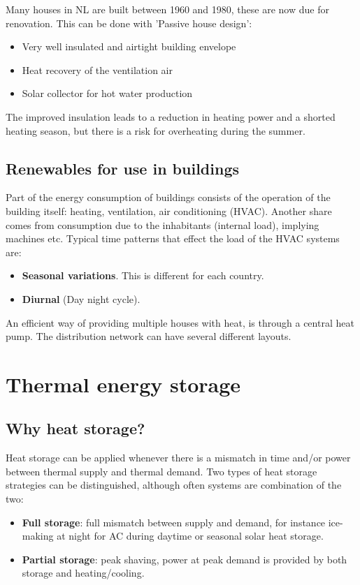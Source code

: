\documentclass[a4paper,10pt]{article}
\begin{document}
Many houses in NL are built between 1960 and 1980, these are now due for renovation. This can be done with 'Passive house design':
\begin{itemize}
 \item Very well insulated and airtight building envelope
 \item Heat recovery of the ventilation air
 \item Solar collector for hot water production
\end{itemize}
The improved insulation leads to a reduction in heating power and a shorted heating season, but there is a risk for overheating during the summer.

\subsection{Renewables for use in buildings}
Part of the energy consumption of buildings consists of the operation of the building itself: heating, ventilation, air conditioning (HVAC). Another share comes from consumption due to the inhabitants (internal load), implying machines etc. Typical time patterns that effect the load of the HVAC systems are:
\begin{itemize}
 \item \textbf{Seasonal variations}. This is different for each country.
 \item \textbf{Diurnal} (Day night cycle).
\end{itemize}

An efficient way of providing multiple houses with heat, is through a central heat pump. The distribution network can have several different layouts.


\section{Thermal energy storage}

\subsection{Why heat storage?}
Heat storage can be applied whenever there is a mismatch in time and/or power between thermal supply and thermal demand. Two types of heat storage strategies can be distinguished, although often systems are combination of the two:
\begin{itemize}
 \item \textbf{Full storage}: full mismatch between supply and demand, for instance ice-making at night for AC during daytime or seasonal solar heat storage.
 \item \textbf{Partial storage}: peak shaving, power at peak demand is provided by both storage and heating/cooling.
\end{itemize}
\end{document}
